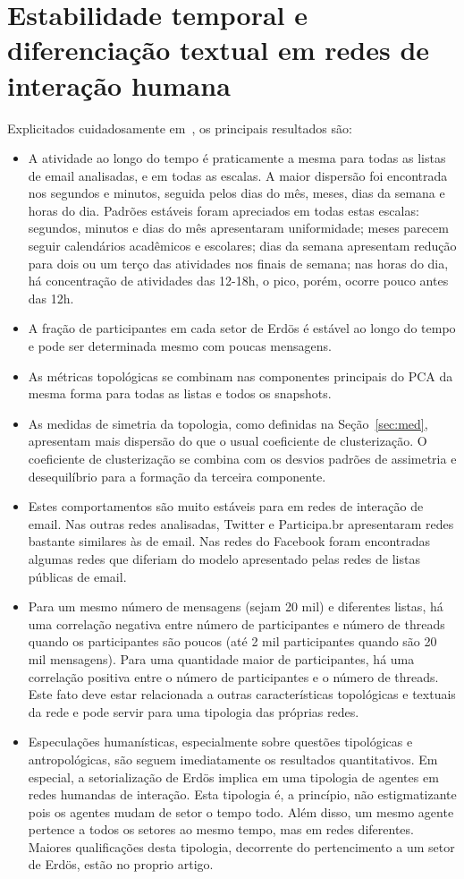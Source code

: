 \documentclass[a4paper,openright,12pt]{report} %
\begin{document}
\section{Estabilidade temporal e diferenciação textual em redes de interação humana}\label{sec:timeS}
Explicitados cuidadosamente em~\cite{timeS}, os principais resultados são:
\begin{itemize}
	\item A atividade ao longo do tempo é praticamente a mesma para todas as listas de email analisadas, e em todas as escalas. A maior dispersão foi encontrada nos segundos e minutos, seguida pelos dias do mês, meses, dias da semana e horas do dia. Padrões estáveis foram apreciados em todas estas escalas: segundos, minutos e dias do mês apresentaram uniformidade; meses parecem seguir calendários acadêmicos e escolares; dias da semana apresentam redução para dois ou um terço das atividades nos finais
		de semana;
		nas horas do dia, há concentração de atividades das 12-18h, o pico, porém, ocorre pouco antes das 12h.
	\item A fração de participantes em cada setor de Erdös é estável ao longo do tempo e pode ser determinada mesmo com poucas mensagens.
	\item As métricas topológicas se combinam nas componentes principais do PCA da mesma forma para todas as listas e todos os snapshots.
	\item As medidas de simetria da topologia, como definidas na Seção~\ref{sec:med}, apresentam mais dispersão do que o usual coeficiente de clusterização. O coeficiente de clusterização se combina com os desvios padrões de assimetria e desequilíbrio para a formação da terceira componente.
	\item Estes comportamentos são muito estáveis para em redes de interação de email. Nas outras redes analisadas, Twitter e Participa.br
		apresentaram redes bastante similares às de email. Nas
	redes do Facebook foram encontradas algumas redes que diferiam
	do modelo apresentado pelas redes de listas públicas de email.
\item Para um mesmo número de mensagens (sejam 20 mil)  e diferentes listas, há uma
	correlação negativa entre número de participantes e número de threads quando os participantes são poucos (até 2 mil participantes quando são 20 mil mensagens). Para uma quantidade maior de participantes, há uma correlação positiva entre o número de participantes e o número de threads. Este fato deve estar relacionada a outras características topológicas e textuais da rede e pode servir para uma tipologia das próprias redes.
	\item Especulações humanísticas, especialmente sobre questões
		tipológicas e antropológicas, são seguem imediatamente
		os resultados quantitativos. Em especial, a setorialização
		de Erdös implica em uma tipologia de agentes em redes humandas de interação.
		Esta tipologia é, a princípio, não estigmatizante pois os agentes mudam de setor o tempo todo. Além disso, um mesmo agente pertence
		a todos os setores ao mesmo tempo, mas em redes diferentes. Maiores qualificações desta tipologia, decorrente do pertencimento
		a um setor de Erdös, estão no proprio artigo.
\end{itemize}
\end{document}
